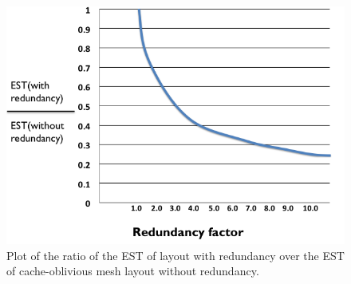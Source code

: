 \begin{figure}[h!]
\centering
\includegraphics[width=\columnwidth]{statistic.png}
  \caption{Plot of the ratio of the EST of layout with redundancy over the EST of cache-oblivious mesh layout without redundancy. }
  \label{fig:statistic}
\end{figure} 

